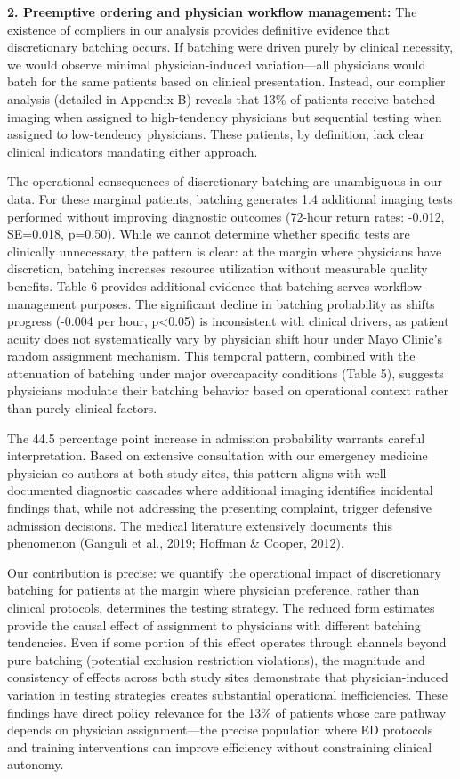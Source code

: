 \documentclass[11pt]{article}
\newcommand{\1}{\hbox{\rm 1\kern-.35em 1}}
\begin{document}
\textbf{2. Preemptive ordering and physician workflow management:} The existence of compliers in our analysis provides definitive evidence that discretionary batching occurs. If batching were driven purely by clinical necessity, we would observe minimal physician-induced variation—all physicians would batch for the same patients based on clinical presentation. Instead, our complier analysis (detailed in Appendix B) reveals that 13\% of patients receive batched imaging when assigned to high-tendency physicians but sequential testing when assigned to low-tendency physicians. These patients, by definition, lack clear clinical indicators mandating either approach.

The operational consequences of discretionary batching are unambiguous in our data. For these marginal patients, batching generates 1.4 additional imaging tests performed without improving diagnostic outcomes (72-hour return rates: -0.012, SE=0.018, p=0.50). While we cannot determine whether specific tests are clinically unnecessary, the pattern is clear: at the margin where physicians have discretion, batching increases resource utilization without measurable quality benefits.
Table 6 provides additional evidence that batching serves workflow management purposes. The significant decline in batching probability as shifts progress (-0.004 per hour, p<0.05) is inconsistent with clinical drivers, as patient acuity does not systematically vary by physician shift hour under Mayo Clinic's random assignment mechanism. This temporal pattern, combined with the attenuation of batching under major overcapacity conditions (Table 5), suggests physicians modulate their batching behavior based on operational context rather than purely clinical factors.

The 44.5 percentage point increase in admission probability warrants careful interpretation. Based on extensive consultation with our emergency medicine physician co-authors at both study sites, this pattern aligns with well-documented diagnostic cascades where additional imaging identifies incidental findings that, while not addressing the presenting complaint, trigger defensive admission decisions. The medical literature extensively documents this phenomenon (Ganguli et al., 2019; Hoffman \& Cooper, 2012).

Our contribution is precise: we quantify the operational impact of discretionary batching for patients at the margin where physician preference, rather than clinical protocols, determines the testing strategy. The reduced form estimates provide the causal effect of assignment to physicians with different batching tendencies. Even if some portion of this effect operates through channels beyond pure batching (potential exclusion restriction violations), the magnitude and consistency of effects across both study sites demonstrate that physician-induced variation in testing strategies creates substantial operational inefficiencies. These findings have direct policy relevance for the 13\% of patients whose care pathway depends on physician assignment—the precise population where ED protocols and training interventions can improve efficiency without constraining clinical autonomy.
\end{document}
